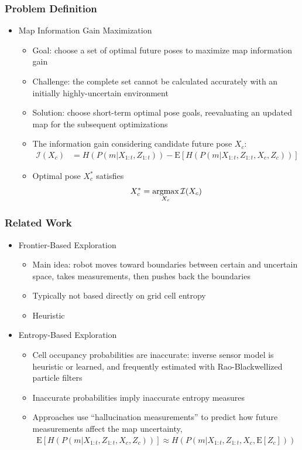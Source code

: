 \documentclass[11pt,professionalfonts,hyperref={pdftex,pdfpagemode=none,pdfstartview=FitH}]{beamer}
\newcommand{\argmax}{\operatornamewithlimits{argmax}}
\renewcommand{\emph}[1]{\textit{\textbf{\color{blue}{#1}}}}
\begin{document}
\begin{frame}
\frametitle{Problem Definition}
\begin{itemize}
        	\item Map Information Gain Maximization
	\begin{itemize}
		\item Goal: choose a set of optimal future poses to maximize map information gain
		\pause
		\item Challenge: the complete set cannot be calculated accurately with an initially highly-uncertain environment
		\pause
		\item Solution: choose short-term optimal pose goals, reevaluating an updated map for the subsequent optimizations
		\pause
		\item The information gain considering candidate future pose $X_c$:%
		\begin{align*}
			\mathcal I(X_c)&=H(P(m|X_{1:t},Z_{1:t}))-\text{E}\left[H(P(m|X_{1:t},Z_{1:t},X_c,Z_c))\right]
		\end{align*}
		\pause
		\item Optimal pose $X^*_c$ satisfies
		\begin{align*}
			X_c^*=\argmax_{X_c}{\mathcal I(X_c)}
		\end{align*}
	\end{itemize}
\end{itemize}


\end{frame}



\begin{frame}
\frametitle{Related Work}
\begin{itemize}
        	\item Frontier-Based Exploration
	\begin{itemize}
		\item Main idea: robot moves toward boundaries between certain and uncertain space, takes measurements, then pushes back the boundaries
		\item Typically not based directly on grid cell entropy
		\item Heuristic
	\end{itemize}
	\pause
	\item Entropy-Based Exploration
	\begin{itemize}
		\item Cell occupancy probabilities are inaccurate: inverse sensor model is heuristic or learned, and frequently estimated with Rao-Blackwellized particle filters
		\item Inaccurate probabilities imply inaccurate entropy measures
		\item Approaches use ``hallucination measurements'' to predict how future measurements \emph{might} affect the map uncertainty,
		\begin{align*}
			\text{E}\left[H(P(m|X_{1:t},Z_{1:t},X_c,Z_c))\right]\approx H(P(m|X_{1:t},Z_{1:t},X_c,\text{E}\left[Z_c\right]))
		\end{align*}
	\end{itemize}
\end{itemize}


\end{frame}
\end{document}
